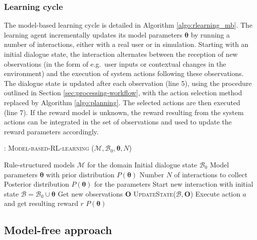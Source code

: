  
\subsubsection*{Learning cycle}

The model-based learning cycle is detailed in Algorithm \ref{algo:rlearning_mb}. The learning agent incrementally updates its model parameters $\boldsymbol\theta$  by running a number of interactions, either with a real user or in simulation. Starting with an initial dialogue state, the interaction alternates between the reception of new observations (in the form of e.g.\ user inputs or contextual changes in the environment) and the execution of system actions following these observations.  The dialogue state is updated after each observation (line 5), using the procedure outlined in Section \ref{sec:processing-workflow}, with the action selection method replaced by Algorithm \ref{algo:planning}. The selected actions are then executed (line 7).   If the reward model is unknown, the reward resulting from the system actions can be integrated in the set of observations and used to update the reward parameters accordingly. 

\begin{algorithm}[ht]
\caption{: \textsc{Model-based-RL-learning} ($\mathcal{M}, \mathcal{B}_0, \boldsymbol\theta, N$)}
\begin{algorithmic}[1]\vspace{1mm}
\REQUIRE Rule-structured models $\mathcal{M}$ for the domain
\REQUIRE Initial dialogue state $\mathcal{B}_0$
\REQUIRE Model parameters $\boldsymbol\theta$ with prior distribution $P(\boldsymbol\theta)$
\REQUIRE Number $N$ of interactions to collect
\ENSURE Posterior distribution $P(\boldsymbol\theta)$ for the parameters  \vspace{1mm}
\STATE Start new interaction with initial state $\mathcal{B} = \mathcal{B}_0 \cup \boldsymbol\theta $
\STATE Get new observations $\mathbf{O}$
\STATE \textsc{UpdateState}($\mathcal{B}, \mathbf{O}$)
\STATE Execute action $a$ and get resulting reward $r$
\ENDIF
\ENDWHILE
\ENDFOR
\RETURN $P(\boldsymbol\theta)$
\end{algorithmic} 
\label{algo:rlearning_mb}
\end{algorithm}



\subsection{Model-free approach}
\label{sec:modelfree}

